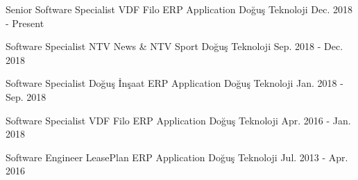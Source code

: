 

\begin{cventries}

  \cventry
    {Senior Software Specialist} %
    {VDF Filo ERP Application} %
    {Doğuş Teknoloji} %
    {Dec. 2018 - Present} %
    {}

  \cventry
    {Software Specialist} %
    {NTV News \& NTV Sport} %
    {Doğuş Teknoloji} %
    {Sep. 2018 - Dec. 2018} %
    {}

  \cventry
    {Software Specialist} %
    {Doğuş İnşaat ERP Application} %
    {Doğuş Teknoloji} %
    {Jan. 2018 - Sep. 2018} %
    {}

  \cventry
    {Software Specialist} %
    {VDF Filo ERP Application} %
    {Doğuş Teknoloji} %
    {Apr. 2016 - Jan. 2018} %
    {}

  \cventry
    {Software Engineer} %
    {LeasePlan ERP Application} %
    {Doğuş Teknoloji} %
    {Jul. 2013 - Apr. 2016} %
    {}

\end{cventries}
